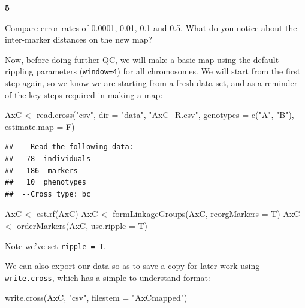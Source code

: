 \documentclass[
]{book}
\makeatletter
\newenvironment{Shaded}{\begin{snugshade}}{\end{snugshade}}
\newcommand{\AttributeTok}[1]{\textcolor[rgb]{0.77,0.63,0.00}{#1}}
\newcommand{\FunctionTok}[1]{\textcolor[rgb]{0.00,0.00,0.00}{#1}}
\newcommand{\NormalTok}[1]{#1}
\newcommand{\OtherTok}[1]{\textcolor[rgb]{0.56,0.35,0.01}{#1}}
\newcommand{\StringTok}[1]{\textcolor[rgb]{0.31,0.60,0.02}{#1}}
\newenvironment{kframe}{%
\medskip{}
\setlength{\fboxsep}{.8em}
 \def\at@end@of@kframe{}%
 \ifinner\ifhmode%
  \def\at@end@of@kframe{\end{minipage}}%
  \begin{minipage}{\columnwidth}%
 \fi\fi%
 \def\FrameCommand##1{\hskip\@totalleftmargin \hskip-\fboxsep
 \colorbox{shadecolor}{##1}\hskip-\fboxsep
     \hskip-\linewidth \hskip-\@totalleftmargin \hskip\columnwidth}%
 \MakeFramed {\advance\hsize-\width
   \@totalleftmargin\z@ \linewidth\hsize
   \@setminipage}}%
 {\par\unskip\endMakeFramed%
 \at@end@of@kframe}
\newenvironment{rmdblock}[1]
  {
  \begin{itemize}
  \renewcommand{\labelitemi}{
    \raisebox{-.7\height}[0pt][0pt]{
      {\setkeys{Gin}{width=3em,keepaspectratio}\texttt{[image: images/\#1]}}
    }
  }
  \setlength{\fboxsep}{1em}
  \begin{kframe}
  \item
  }
  {
  \end{kframe}
  \end{itemize}
  }
\newenvironment{rmdquiz}
  {\begin{rmdblock}{quiz}}
  {\end{rmdblock}}
\makeatother
\begin{document}
\begin{rmdquiz}
\textbf{5}

Compare error rates of 0.0001, 0.01, 0.1 and 0.5. What do you notice about the inter-marker distances on the new map?
\end{rmdquiz}

Now, before doing further QC, we will make a basic map using the default rippling parameters (\texttt{window=4}) for all chromosomes. We will start from the first step again, so we know we are starting from a fresh data set, and as a reminder of the key steps required in making a map:

\begin{Shaded}
\begin{Highlighting}[]
\NormalTok{AxC }\OtherTok{\textless{}{-}} \FunctionTok{read.cross}\NormalTok{(}\StringTok{"csv"}\NormalTok{, }\AttributeTok{dir =} \StringTok{"data"}\NormalTok{, }\StringTok{"AxC\_R.csv"}\NormalTok{, }\AttributeTok{genotypes =} \FunctionTok{c}\NormalTok{(}\StringTok{"A"}\NormalTok{, }
    \StringTok{"B"}\NormalTok{), }\AttributeTok{estimate.map =}\NormalTok{ F)}
\end{Highlighting}
\end{Shaded}

\begin{verbatim}
##  --Read the following data:
##   78  individuals
##   186  markers
##   10  phenotypes
##  --Cross type: bc
\end{verbatim}

\begin{Shaded}
\begin{Highlighting}[]
\NormalTok{AxC }\OtherTok{\textless{}{-}} \FunctionTok{est.rf}\NormalTok{(AxC)}
\NormalTok{AxC }\OtherTok{\textless{}{-}} \FunctionTok{formLinkageGroups}\NormalTok{(AxC, }\AttributeTok{reorgMarkers =}\NormalTok{ T)}
\NormalTok{AxC }\OtherTok{\textless{}{-}} \FunctionTok{orderMarkers}\NormalTok{(AxC, }\AttributeTok{use.ripple =}\NormalTok{ T)}
\end{Highlighting}
\end{Shaded}

Note we've set \texttt{ripple\ =\ T}.

We can also export our data so as to save a copy for later work using \texttt{write.cross}, which has a simple to understand format:

\begin{Shaded}
\begin{Highlighting}[]
\FunctionTok{write.cross}\NormalTok{(AxC, }\StringTok{"csv"}\NormalTok{, }\AttributeTok{filestem =} \StringTok{"AxCmapped"}\NormalTok{)}
\end{Highlighting}
\end{Shaded}
\end{document}
